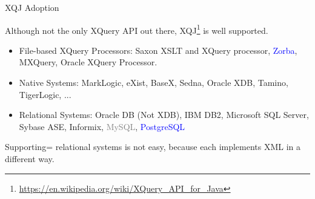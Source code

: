 \begin{frame}{XQJ Adoption}

Although not the only XQuery API out there, XQJ\footnote{\url{https://en.wikipedia.org/wiki/XQuery_API_for_Java}} is well supported.

\begin{itemize}[-]
\item \alert{File-based XQuery Processors}: Saxon XSLT and XQuery processor, \textcolor{blue}{Zorba}, MXQuery, Oracle XQuery Processor.

\item \alert{Native Systems}: MarkLogic, eXist, BaseX, Sedna, Oracle XDB, Tamino, TigerLogic, ...

\item \alert{Relational Systems}: Oracle DB (Not XDB), IBM DB2, Microsoft SQL Server, Sybase ASE, Informix, \textcolor{gray}{MySQL}, \textcolor{blue}{PostgreSQL}
\end{itemize}

Supporting= relational systems is not easy, because each implements XML in a different way. 
\end{frame}














